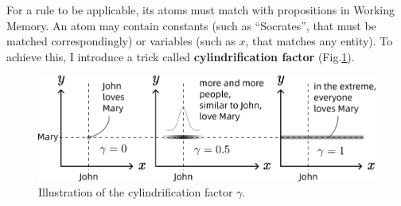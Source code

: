 \documentclass[runningheads]{llncs}
\begin{document}
For a rule to be applicable, its atoms must match with propositions in Working Memory.  An atom may contain constants (such as ``Socrates'', that must be matched correspondingly) or variables (such as $x$, that matches any entity).  To achieve this, I introduce a trick called \textbf{cylindrification factor} (Fig.\ref{fig:cylindrify-example}).

\begin{figure}
	\includegraphics[scale=.6]{cylindrify-example.png}
	\caption{Illustration of the cylindrification factor $\gamma$.}
	\label{fig:cylindrify-example}
\end{figure}
\end{document}
